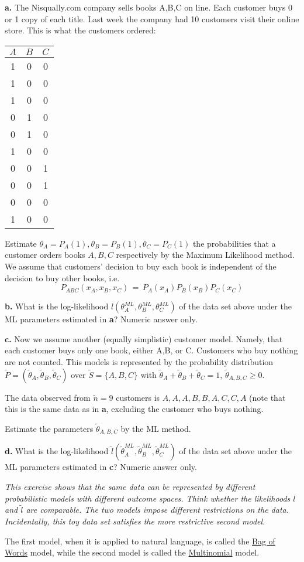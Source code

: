 \documentclass[10pt]{article}
\newcommand{\beq}{\begin{equation}}
\newcommand{\eeq}{\end{equation}}
\newcommand{\tilp}{\tilde{P}}
\newcommand{\tiltt}{\tilde{\theta}}
\newcommand{\ML}{^{ML}}
\begin{document}
{\bf a.} The Nisqually.com company sells books A,B,C on line. Each customer buys 0 or 1 
copy of each title. Last week the company had 10 customers visit their 
online store. This is what the customers ordered: 
\begin{center} 
\begin{tabular}{ccc} 
$A$ & $B$  & $C$\\ 
\hline 
1 & 0 & 0 \\ 
1& 0& 0\\ 
1& 0& 0 \\ 
0& 1& 0 \\ 
0& 1& 0\\ 
1& 0& 0\\ 
0& 0& 1\\ 
0& 0& 1\\ 
0& 0& 0\\ 
1& 0& 0\\ 
\hline 
\end{tabular} 
\end{center} 
 
Estimate $\theta_A=P_A(1),\theta_B=P_B(1),\theta_C=P_C(1)$ the probabilities that a customer 
orders books $A,B,C$ respectively by the Maximum Likelihood method. We assume that customers' decision to buy each book is independent of the decision to buy other books, i.e.
\beq
P_{ABC}(x_A,x_B,x_C)\,=\,P_A(x_A)P_B(x_B)P_C(x_C)
\eeq


{\bf b.} What is the log-likelihood $l(\theta_A\ML,\theta_B\ML,\theta_C\ML)$ of the data set above under the ML parameters estimated in {\bf a}? Numeric answer only.

{\bf c.} Now we assume another (equally simplistic) customer model. Namely, that each customer buys only one book, either A,B, or C. Customers who buy nothing are not counted. This models is represented by the probability distribution $\tilp=(\tiltt_A,\tiltt_B,\tiltt_C)$  over $\tilde{S}=\{A,B,C\}$ with $\tiltt_A+\tiltt_B+\tiltt_C=1$, $\tiltt_{A,B,C}\geq 0$. 

The data observed from $\tilde{n}=9$ customers is $A,A,A,B,B,A,C,C,A$ (note that this is the same data as in {\bf a}, excluding the customer who buys nothing.

Estimate the parameters $\tiltt_{A,B,C}$ by the ML method.

{\bf d.} What is the log-likelihood $\tilde{l}(\tiltt_A\ML,\tiltt_B\ML,\tiltt_C\ML)$ of the data set above under the ML parameters estimated in {\bf c}? Numeric answer only.

{\em This exercise shows that the same data can be represented by different probabilistic models with different outcome spaces. Think whether the likelihoods $l$ and $\tilde{l}$ are comparable. The two models impose different restrictions on the data. Incidentally, this toy data set satisfies the more restrictive second model.

  The first model, when it is applied to natural language, is called the \underline{Bag of Words} model, while the second model is called the \underline{Multinomial} model.}
\end{document}
